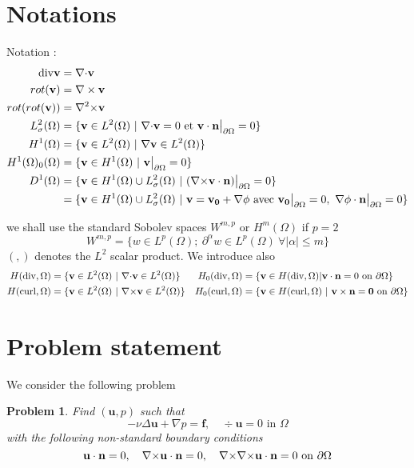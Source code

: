 \documentclass{article}
\newtheorem{problem}{Problem}
\newcommand{\Wmp}[2][2]{\ensuremath{W^{{#2},{#1}}}\xspace}
\newcommand{\Hdiv}{\ensuremath{H(\mathrm{div},\Omega)}\xspace}
\newcommand{\Hdivo}{\ensuremath{H_0(\mathrm{div},\Omega)}\xspace}
\newcommand{\Hcurl}{\ensuremath{H(\mathrm{curl},\Omega)}\xspace}
\newcommand{\Hcurlo}{\ensuremath{H_0(\mathrm{curl},\Omega)}\xspace}
\newcommand{\Hp}[1][1]{\ensuremath{H^{#1}(\Omega)}\xspace}
\begin{document}
\section{Notations}
Notation :
\begin{align*}
\mathrm{div} \mathbf{v} &= \div \mathbf{v} \\
rot(\mathbf{v})&=\nabla \times \mathbf{v}\\
rot(rot(\mathbf{v}))&=\rott \mathbf{v}\\
L^2_\sigma(\Omega) &= \{\mathbf{v} \in L^2(\Omega)\ |\ \div \mathbf{v} = 0\text{ et }\mathbf{v}\cdot \mathbf{n}\restr = 0 \}\\
\Hp &= \{\mathbf{v} \in L^2(\Omega)\ |\ \grad \mathbf{v}\in L^2(\Omega)\}\\
\Hp_0(\Omega) &= \{\mathbf{v} \in \Hp\ |\ \mathbf{v}\restr = 0\}\\
D^1(\Omega) &= \{\mathbf{v} \in \Hp\cup L^2_\sigma(\Omega)\ |\ (\rot \mathbf{v}\cdot \mathbf{n})\restr = 0  \}\\
&=\{\mathbf{v} \in \Hp\cup L^2_\sigma(\Omega)\ |\ \mathbf{v}=\mathbf{v_0}+\grad\phi \text{ avec } \mathbf{v_0}\restr = 0,\ \grad\phi\cdot \mathbf{n}\restr = 0 \}
\end{align*}

we shall use the standard Sobolev spaces \Wmp[p]{m} or \Hp[m] if $p=2$
\begin{equation*}
  \Wmp[p]{m} = \{ w \in L^p(\Omega);\ \partial^\alpha w \in L^p(\Omega)\ \forall
  |\alpha| \leq m \}
\end{equation*}
$(,)$ denotes the $L^2$ scalar product.
We introduce also
\begin{align*}
  \Hdiv &= \{\mathbf{v} \in L^2(\Omega)\ |\ \div\mathbf{v} \in L^2(\Omega) \}  & \Hdivo & = \{ \mathbf{v} \in \Hdiv | \mathbf{v} \cdot \mathbf{n} = 0  \mbox{ on } \partial \Omega \} \\
  \Hcurl &= \{\mathbf{v} \in L^2(\Omega)\ |\ \rot\mathbf{v} \in L^2(\Omega) \}
  & \Hcurlo &= \{\mathbf{v} \in \Hcurl\ |\ \mathbf{v} \times \mathbf{n} =
  \mathbf{0} \mbox{ on } \partial \Omega \}
\end{align*}

\section{Problem statement}
\label{sec:problem-statement}

We consider the following problem
\begin{problem}
  \label{prob:1}
  Find $(\mathbf{u},p)$ such that
  \begin{equation}
    \label{eq:1}
    -\nu \Delta \textbf{u}  + \nabla p = \textbf{f}, \quad    \div \mathbf{u} =
    0 \mbox{ in } \Omega
  \end{equation}
  with the following non-standard boundary conditions
  \begin{equation}
    \label{eq:2}
    \mathbf{u} \cdot \mathbf{n} = 0,\quad {\nabla\times} \mathbf{u} \cdot \mathbf{n} = 0,
    \quad {\nabla\times} {\nabla\times} \mathbf{u} \cdot \mathbf{n} = 0 \mbox{ on } \partial \Omega
  \end{equation}
\end{problem}
\end{document}
